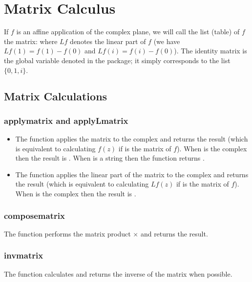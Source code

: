 \section{Matrix Calculus}

If $f$ is an affine application of the complex plane, we will call the list (table) of $f$ the matrix:
where $Lf$ denotes the linear part of $f$ (we have $Lf(1) = f(1)-f(0)$ and $Lf(i) = f(i)-f(0)$). The identity matrix is the global variable denoted  in the \luadrawenv package; it simply corresponds to the list $\{0,1,i\}$.

\subsection{Matrix Calculations}

\subsubsection{applymatrix and applyLmatrix}
\begin{itemize}
    \item The function  applies the matrix  to the complex  and returns the result (which is equivalent to calculating $f(z)$ if  is the matrix of $f$). When  is the complex  then the result is . When  is a string then the function returns .

    \item The function  applies the linear part of the matrix  to the complex  and returns the result (which is equivalent to calculating $Lf(z)$ if  is the matrix of $f$). When  is the complex  then the result is .
\end{itemize}

\subsubsection{composematrix}
The function  performs the matrix product $\times$ and returns the result.

\subsubsection{invmatrix}
The function  calculates and returns the inverse of the matrix  when possible.

